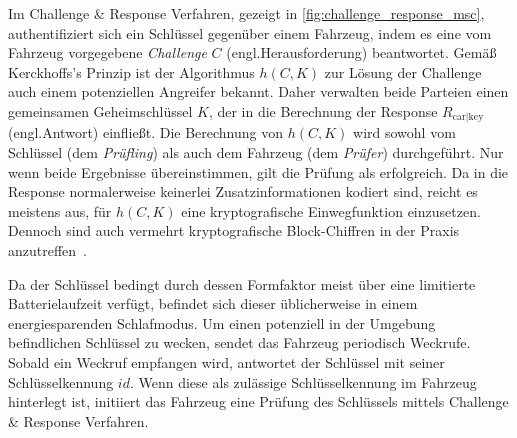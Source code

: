 Im \foreignlanguage{english}{Challenge \& Response} Verfahren, gezeigt in \cref{fig:challenge_response_msc}, authentifiziert sich ein Schlüssel gegenüber einem Fahrzeug, indem es eine vom Fahrzeug vorgegebene \emph{Challenge} \(C\) (engl.\@ Herausforderung) beantwortet. Gemäß Kerckhoffs's Prinzip ist der Algorithmus \(h(C, K)\) zur Lösung der \foreignlanguage{english}{Challenge} auch einem potenziellen Angreifer bekannt. Daher verwalten beide Parteien einen gemeinsamen Geheimschlüssel \(K\), der in die Berechnung der \foreignlanguage{english}{Response} \(R_{\mathrm{car}|\mathrm{key}}\) (engl.\@ Antwort) einfließt. Die Berechnung von \(h(C, K)\) wird sowohl vom Schlüssel (dem \emph{Prüfling}) als auch dem Fahrzeug (dem \emph{Prüfer}) durchgeführt. Nur wenn beide Ergebnisse übereinstimmen, gilt die Prüfung als erfolgreich. Da in die \foreignlanguage{english}{Response} normalerweise keinerlei Zusatzinformationen kodiert sind, reicht es meistens aus, für \(h(C, K)\) eine kryptografische Einwegfunktion einzusetzen. Dennoch sind auch vermehrt kryptografische Block-Chiffren in der Praxis anzutreffen~\cite{Wouters2019}.

Da der Schlüssel bedingt durch dessen Formfaktor meist über eine limitierte Batterielaufzeit verfügt, befindet sich dieser üblicherweise in einem energiesparenden Schlafmodus. Um einen potenziell in der Umgebung befindlichen Schlüssel zu wecken, sendet das Fahrzeug periodisch Weckrufe. Sobald ein Weckruf empfangen wird, antwortet der Schlüssel mit seiner Schlüsselkennung \(\mathit{id}\). Wenn diese als zulässige Schlüsselkennung im Fahrzeug hinterlegt ist, initiiert das Fahrzeug eine Prüfung des Schlüssels mittels \foreignlanguage{english}{Challenge \& Response} Verfahren.

